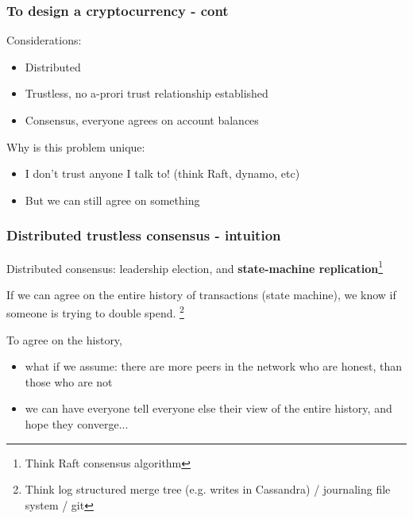 \documentclass{beamer}
\begin{document}
\begin{frame}
\frametitle{To design a cryptocurrency - cont}

Considerations:
\begin{itemize}
  \item Distributed
  \item Trustless, no a-prori trust relationship established
  \item Consensus, everyone agrees on account balances
\end{itemize}

\vspace{0.3in}
Why is this problem unique:

\begin{itemize}
  \item I don't trust anyone I talk to! (think Raft, dynamo, etc)
  \item But we can still agree on something
\end{itemize}

\end{frame}

\begin{frame}
\frametitle{Distributed trustless consensus - intuition}

Distributed consensus: leadership election, and \textbf{state-machine replication}\footnote{Think Raft consensus algorithm}

\vspace{0.2in}
If we can agree on the entire history of transactions (state machine), we know if someone is trying to double spend.
\footnote{Think log structured merge tree (e.g. writes in Cassandra) / journaling file system / git}

\vspace{0.2in}
To agree on the history,

\begin{itemize}
  \item what if we assume: there are more peers in the network who are honest, than those who are not
  \item we can have everyone tell everyone else their view of the entire history, and hope they converge...
\end{itemize}

\end{frame}
\end{document}
